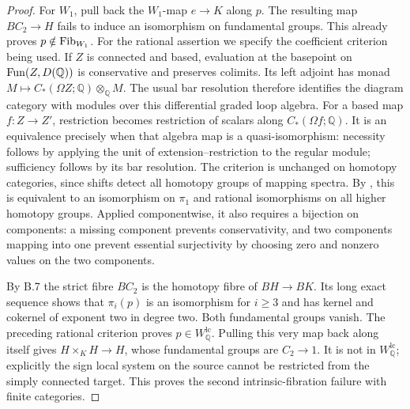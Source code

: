 \begin{proof}
For $W_1$, pull back the $W_1$-map $e\to K$ along $p$. The resulting
map $BC_2\to H$ fails to induce an isomorphism on fundamental groups.
This already proves $p\notin\mathrm{Fib}_{W_1}$.
For the rational assertion we specify the coefficient criterion being used.
If $Z$ is connected and based, evaluation at the basepoint on
$\mathrm{Fun}(Z,D(\mathbb Q))$ is conservative and preserves colimits. Its left
adjoint has monad $M\mapsto C_*(\Omega Z;\mathbb Q)\otimes_{\mathbb Q}M$.
The usual bar resolution therefore identifies the diagram category with
modules over this differential graded loop algebra. For a based map
$f:Z\to Z'$, restriction becomes restriction of scalars along
$C_*(\Omega f;\mathbb Q)$. It is an equivalence precisely when that
algebra map is a quasi-isomorphism: necessity follows by applying the
unit of extension--restriction to the regular module; sufficiency follows
by its bar resolution. The criterion is unchanged on homotopy categories,
since shifts detect all homotopy groups of mapping spectra.
By \citet[Theorem 3]{BCRiveraWierstraZeinalian2021}, this is equivalent
to an isomorphism on $\pi_1$ and rational isomorphisms on all higher
homotopy groups. Applied componentwise, it also requires a bijection on
components: a missing component prevents conservativity, and two components
mapping into one prevent essential surjectivity by choosing zero and
nonzero values on the two components.

By B.7 the strict fibre $BC_2$ is the homotopy fibre of $BH\to BK$.
Its long exact sequence shows that $\pi_i(p)$ is an isomorphism for
$i\geq3$ and has kernel and cokernel of exponent two in degree two.
Both fundamental groups vanish. The preceding rational criterion proves
$p\in W_{\mathbb Q}^{\mathrm{lc}}$.
Pulling this very map back along itself gives
$H\times_KH\to H$, whose fundamental groups are $C_2\to1$.
It is not in $W_{\mathbb Q}^{\mathrm{lc}}$; explicitly the sign local
system on the source cannot be restricted from the simply connected target.
This proves the second intrinsic-fibration failure with finite categories.
\end{proof}

